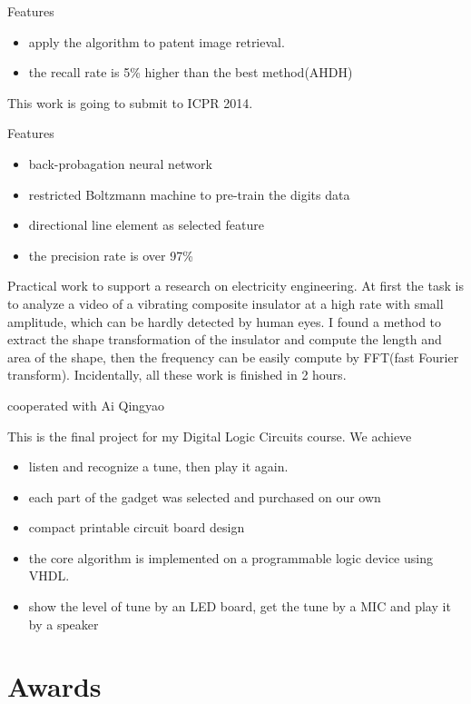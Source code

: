 \documentclass[11pt,a4paper, sans]{moderncv} %
\begin{document}
{
Features
\begin{itemize}
\item apply the algorithm to patent image retrieval.
\item the recall rate is 5\% higher than the best method(AHDH)
\end{itemize}
This work is going to submit to ICPR 2014.
}

{
Features
\begin{itemize}
\item back-probagation neural network
\item restricted Boltzmann machine to pre-train the digits data
\item directional line element as selected feature
\item the precision rate is over 97\% 
\end{itemize}
}

{
Practical work to support a research on electricity engineering. At first the task is to analyze a video of a vibrating composite insulator at a high rate with small amplitude, which can be hardly detected by human eyes. I found a method to extract the shape transformation of the insulator and compute the length and area of the shape, then the frequency can be easily compute by FFT(fast Fourier transform). Incidentally, all these work is finished in 2 hours.
}

{cooperated with Ai Qingyao}{}
{
This is the final project for my Digital Logic Circuits course. We achieve
\begin{itemize}
\item listen and recognize a tune, then play it again.
\item each part of the gadget was selected and purchased on our own
\item compact printable circuit board design
\item the core algorithm is implemented on a programmable logic device using VHDL.
\item show the level of tune by an LED board, get the tune by a MIC and play it by a speaker
\end{itemize}
}



\section{Awards}
\end{document}
